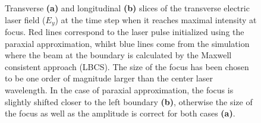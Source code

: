 \begin{figure}[h!]
	\centering
	\hspace{2mm}
	\caption{Transverse \textbf{(a)} and longitudinal \textbf{(b)} slices of the transverse electric laser field ($ E_{y} $) at the time step when it reaches maximal intensity at focus. Red lines correspond to the laser pulse initialized using the paraxial approximation, whilst blue lines come from the simulation where the beam at the boundary is calculated by the Maxwell consistent approach (LBCS). The size of the focus has been chosen to be one order of magnitude larger than the center laser wavelength. In the case of paraxial approximation, the focus is slightly shifted closer to the left boundary \textbf{(b)}, otherwise the size of the focus as well as the amplitude is correct for both cases \textbf{(a)}.}
	\label{fig:6}
\end{figure}

